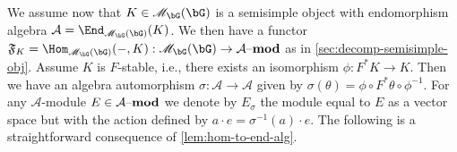 \documentclass[eqthmnum,nocolour,skinny]{jt-calcs}
\newcommand{\lmod}[1]{\ensuremath{#1\text{--{\bf mod}}}}
\begin{document}
%

\begin{pa}\label{pa:algebra-auto}
We assume now that $K \in \mathscr{M}_{\bG}(\bG)$ is a semisimple object with endomorphism algebra $\mathcal{A} = \End_{\mathscr{M}_{\bG}(\bG)}(K)$. We then have a functor $\mathfrak{F}_K = \Hom_{\mathscr{M}_{\bG}(\bG)}(-,K) : \mathscr{M}_{\bG}(\bG) \to \lmod{\mathcal{A}}$ as in \cref{sec:decomp-semisimple-obj}. Assume $K$ is $F$-stable, i.e., there exists an isomorphism $\phi : F^*K \to K$. Then we have an algebra automorphism $\sigma : \mathcal{A} \to \mathcal{A}$ given by $\sigma(\theta) = \phi\circ F^*\theta \circ \phi^{-1}$. For any $\mathcal{A}$-module $E \in \lmod{\mathcal{A}}$ we denote by $E_{\sigma}$ the module equal to $E$ as a vector space but with the action defined by $a\cdot e = \sigma^{-1}(a)\cdot e$. The following is a straightforward consequence of \cref{lem:hom-to-end-alg}.
\end{pa}
\end{document}
